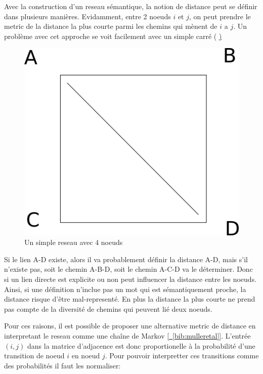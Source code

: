 Avec la construction d'un reseau sémantique, la notion de distance peut se définir
dans plusieurs manières. Evidamment, entre 2 noeuds $i$ et $j$, on peut prendre le metric de
la distance la plus courte parmi les chemins qui mènent de $i$ a $j$. Un problème avec cet
approche se voit facilement avec un simple carré ( \hyperref[fig:square] )

\begin{figure}[!ht]
\centering
\includegraphics{Images/square.png}
%
\caption{Un simple reseau avec 4 noeuds}
\label{fig:square}
\end{figure}

Si le lien A-D existe, alors il va probablement définir la distance A-D, mais s'il n'existe pas,
soit le chemin A-B-D, soit le chemin A-C-D va le déterminer. Donc si un lien directe est explicite ou
non peut influencer la distance entre les noeuds. Ainsi, si une définition n'inclue pas un mot qui
est sémantiquement proche, la distance risque d'être mal-representé. En plus la distance la plus
courte ne prend pas compte de la diversité de chemins qui peuvent lié deux noeuds.

Pour ces raisons, il est possible de proposer une alternative metric de distance en interpretant
le reseau comme une chaîne de Markov \hyperref[bib:mulleretal]{[~\ref*{bib:mulleretal}]}.
L'entrée $(i,j)$ dans la  matrice d'adjacence est donc
proportionelle à la probabilité d'une transition de noeud $i$ en noeud $j$. Pour pouvoir interpretter
ces transitions comme des probabilités il faut les normaliser:

